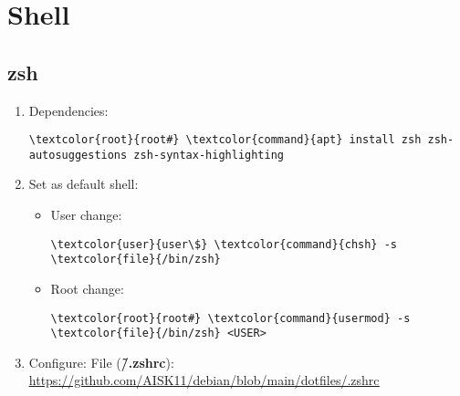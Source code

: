 \documentclass[10pt, a4paper, onecolumn, openany]{book} %
\begin{document}
\section{Shell}
\subsection{zsh}
\begin{enumerate}
    \item Dependencies:
\begin{Verbatim}[commandchars=\\\{\}]
\textcolor{root}{root#} \textcolor{command}{apt} install zsh zsh-autosuggestions zsh-syntax-highlighting
\end{Verbatim}
    \item Set as default shell:
    \begin{itemize}
        \item User change:
\begin{Verbatim}[commandchars=\\\{\}]
\textcolor{user}{user\$} \textcolor{command}{chsh} -s \textcolor{file}{/bin/zsh}
\end{Verbatim}
        \item Root change:
\begin{Verbatim}[commandchars=\\\{\}]
\textcolor{root}{root#} \textcolor{command}{usermod} -s \textcolor{file}{/bin/zsh} <USER>
\end{Verbatim}
    \end{itemize}
    \item Configure:
\newline File (\textbf{\textcolor{file}{\~/.zshrc}}):
\newline \underline{\url{https://github.com/AISK11/debian/blob/main/dotfiles/.zshrc}}
\end{enumerate}
\end{document}
